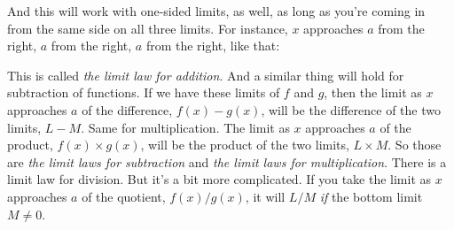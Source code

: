 \documentclass[pdftex, brazil, 12pt, twoside]{article}
\begin{document}
And this will work with one-sided limits,
as well, as long as you're coming in from the same side
on all three limits.
For instance, $x$ approaches $a$ from the right,
$a$ from the right, $a$ from the right, like that:

\begin{figure}[H]
  \begin{center}
  \end{center}
\end{figure}

This is called \emph{the limit law for addition}.
And a similar thing will hold for subtraction of functions.
If we have these limits of $f$ and $g$,
then the limit as $x$ approaches $a$ of the difference,
$f(x) - g(x)$, will be the difference
of the two limits, $L - M$.
Same for multiplication.
The limit as $x$ approaches $a$ of the product, $f(x) \times g(x)$,
will be the product of the two limits, $L \times M$.
So those are \emph{the limit laws for subtraction} and \emph{the limit laws for multiplication}.
There is a limit law for division.
But it's a bit more complicated.
If you take the limit as $x$ approaches
$a$ of the quotient, $f(x)/g(x)$,
it will $L/M$ \emph{if} the bottom limit $M \ne 0$.

\begin{figure}[H]
  \begin{center}
  \end{center}
\end{figure}
\end{document}
